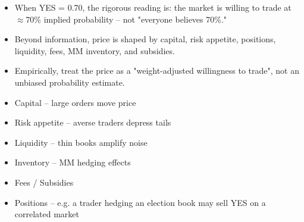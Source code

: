 \begin{frame}[t]
\par{}
\begin{pmbody}
\begin{itemize}\pmspreaditems
  \item When YES = 0.70, the rigorous reading is: the market is willing to trade at $\approx$70\% implied probability -- not "everyone believes 70\%."
  \item Beyond information, price is shaped by capital, risk appetite, positions, liquidity, fees, MM inventory, and subsidies.
  \item Empirically, treat the price as a "weight-adjusted willingness to trade", not an unbiased probability estimate.
\end{itemize}
\vspace{2pt}
\begin{itemize}
  \item[\textcolor{pmBlue}{\textbf{1}}] \textcolor{pmBlue}{\textbf{}} Capital -- large orders move price
  \item[\textcolor{pmBlue}{\textbf{2}}] \textcolor{pmBlue}{\textbf{}} Risk appetite -- averse traders depress tails
  \item[\textcolor{pmBlue}{\textbf{3}}] \textcolor{pmBlue}{\textbf{}} Liquidity -- thin books amplify noise
  \item[\textcolor{pmBlue}{\textbf{4}}] \textcolor{pmBlue}{\textbf{}} Inventory -- MM hedging effects
  \item[\textcolor{pmBlue}{\textbf{5}}] \textcolor{pmBlue}{\textbf{}} Fees / Subsidies
  \item[\textcolor{pmBlue}{\textbf{6}}] \textcolor{pmBlue}{\textbf{}} Positions -- e.g. a trader hedging an election book may sell YES on a correlated market
\end{itemize}
\end{pmbody}
\end{frame}

